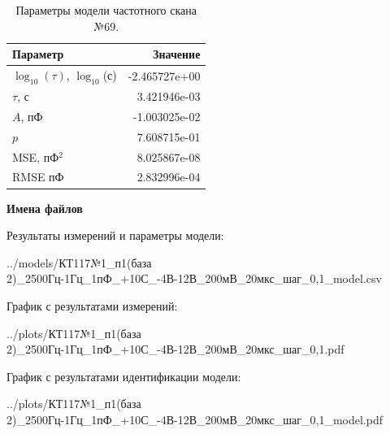 \begin{table}[!ht]
    \centering
    \caption{Параметры модели частотного скана №69.}
    \begin{tabular}{|l|r|}
        \hline
        Параметр                                       & Значение                  \\ \hline
        $\log_{10}(\tau)$, $\log_{10}$(с)              & -2.465727e+00             \\ \hline
        $\tau$, с                                      & 3.421946e-03              \\ \hline
        $A$, пФ                                        & -1.003025e-02             \\ \hline
        $p$                                            & 7.608715e-01              \\ \hline
        MSE, пФ$^2$                                    & 8.025867e-08              \\ \hline
        RMSE пФ                                        & 2.832996e-04              \\ \hline
    \end{tabular}
    \label{table:frequency_scan_model_69}
\end{table}

\textbf{Имена файлов}

Результаты измерений и параметры модели:

\scriptsize../models/КТ117№1\_п1(база 2)\_2500Гц-1Гц\_1пФ\_+10С\_-4В-12В\_200мВ\_20мкс\_шаг\_0,1\_model.csv
\normalsize

График с результатами измерений:

\scriptsize../plots/КТ117№1\_п1(база 2)\_2500Гц-1Гц\_1пФ\_+10С\_-4В-12В\_200мВ\_20мкс\_шаг\_0,1.pdf
\normalsize

График с результатами идентификации модели:

\scriptsize../plots/КТ117№1\_п1(база 2)\_2500Гц-1Гц\_1пФ\_+10С\_-4В-12В\_200мВ\_20мкс\_шаг\_0,1\_model.pdf
\normalsize


